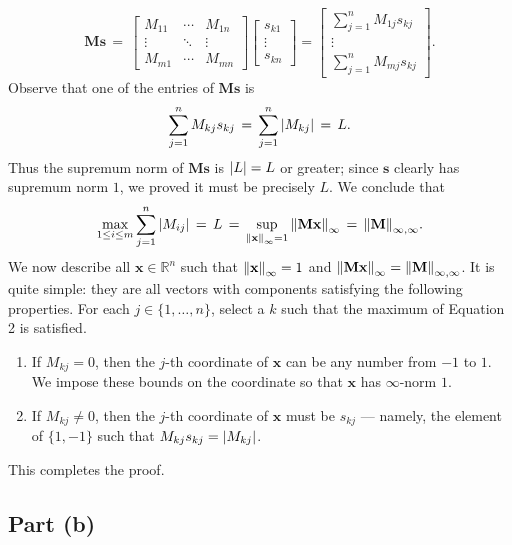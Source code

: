 \documentclass[11pt]{article}
\renewcommand{\vec}[1]{\mathbf{#1}}
\newcommand{\mat}[1]{\mathbf{#1}}
\begin{document}
\[
  \mat{M} \vec{s} \, = \, \begin{bmatrix} M_{11} & \cdots & M_{1n} \\ \vdots & \ddots & \vdots \\ M_{m1} & \cdots & M_{mn} \end{bmatrix} \begin{bmatrix} s_{k1} \\ \vdots \\ s_{kn} \end{bmatrix} = \begin{bmatrix} \sum\limits_{j = 1}^{n} M_{1j}s_{kj} \\ \vdots \\ \sum\limits_{j = 1}^{n} M_{mj}s_{kj} \end{bmatrix}.
\]
Observe that one of the entries of $\mat{M} \vec{s}$ is
\[
  \sum\limits_{j = 1}^{n} M_{kj}s_{kj} \, = \, \sum\limits_{j = 1}^{n} \abs{M_{kj}} \, = \, L.
\]
Thus the supremum norm of $\mat{M} \vec{s}$ is $\abs{L} = L$ or greater; since $\vec{s}$ clearly has supremum norm $1$, we proved it must be precisely $L$. We conclude that
\[
  \max\limits_{1 \le i \le m} \sum\limits_{j = 1}^{n} \abs{M_{ij}} \, = \, L \, = \, \sup\limits_{\norm{\vec{x}}_{\infty} = 1} \norm{\mat{M} \vec{x}}_{\infty} \, = \, \norm{\mat{M}}_{\infty, \infty}.
\]
We now describe all $\vec{x} \in \mathbb{R}^{n}$ such that $\norm{\vec{x}}_{\infty} = 1$ and $\norm{\mat{M}\vec{x}}_{\infty} = \norm{\mat{M}}_{\infty, \infty}$. It is quite simple: they are all vectors with components satisfying the following properties. For each $j \in \{ 1, \ldots, n \}$, select a $k$ such that the maximum of Equation 2 is satisfied.
\begin{enumerate} 
  \item If $M_{kj} = 0$, then the $j$-th coordinate of $\vec{x}$ can be any number from $-1$ to $1$. We impose these bounds on the coordinate so that $\vec{x}$ has $\infty$-norm $1$.
  \item If $M_{kj} \ne 0$, then the $j$-th coordinate of $\vec{x}$ must be $s_{kj}$ --- namely, the element of $\{ 1, -1 \}$ such that $M_{kj}s_{kj} = \abs{M_{kj}}$.
\end{enumerate}
This completes the proof.


\subsection{Part (b)}
\end{document}
